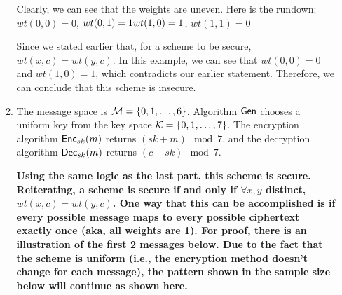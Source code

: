\documentclass[11pt]{article}
\begin{document}
\begin{enumerate}
\begin{enumerate}
{ \newline

    Clearly, we can see that the weights are uneven. Here is the rundown: \newline
    $wt(0,0) = 0$, $wt(0,1) = 1 \newline
    wt(1,0) = 1$, $wt(1,1) = 0$
    
    Since we stated earlier that, for a scheme to be secure, $wt(x,c)=wt(y,c)$. In this example, we can see that $wt(0,0)=0$ and $wt(1,0)=1$, which contradicts our earlier statement. Therefore, we can conclude that this scheme is insecure.
    }
    \newpage
    \item The message space is ${\mathcal M} = \{0,1, \dotsc, 6 \}$. Algorithm $\mathsf{Gen}$ chooses a uniform key from the key space ${\mathcal K} = \{0,1, \dotsc, 7\}$. The encryption algorithm $\mathsf{Enc}_{sk}(m)$ returns $(sk+m) \mod 7$, and the decryption algorithm $\mathsf{Dec}_{sk}(m)$ returns $(c-sk) \mod 7$.
    {\bfseries
    \newline
    \newline
    Using the same logic as the last part, this scheme is secure. Reiterating, a scheme is secure if and only if $\forall x,y$ distinct, $wt(x,c) = wt(y,c)$. One way that this can be accomplished is if every possible message maps to every possible ciphertext exactly once (aka, all weights are 1). For proof, there is an illustration of the first 2 messages below. Due to the fact that the scheme is uniform (i.e., the encryption method doesn't change for each message), the pattern shown in the sample size below will continue as shown here. \newline


}
\end{enumerate}
\end{enumerate}
\end{document}
